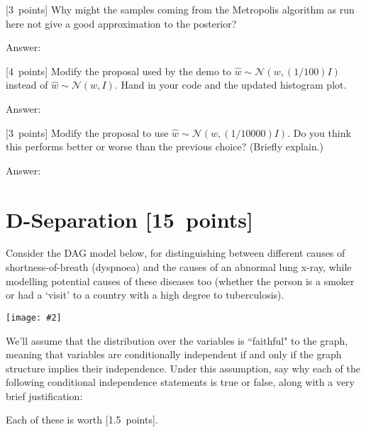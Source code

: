 \documentclass{article}
\newcommand{\ask}[1]{\textcolor{question}{#1}}
\newenvironment{answer}{\par\begingroup\color{answer}Answer: }{\endgroup}
\newcommand{\pts}[1]{\textcolor{points}{[#1~points]}}
\newcommand{\TODO}{\color{red}{TODO}}
\newcommand{\centerfig}[2]{\begin{center}\texttt{[image: \#2]}\end{center}}
\begin{document}
\begin{qlist}

\item \pts{3} \ask{Why might the samples coming from the Metropolis algorithm as run here not give a good approximation to the posterior?}
\begin{answer}\TODO\end{answer}

\item \pts{4} Modify the proposal used by the demo to $\hat{w} \sim \mathcal{N}(w,(1/100) I)$ instead of $\hat{w} \sim \mathcal{N}(w,I)$. \ask{Hand in your code and the updated histogram plot.}

\begin{answer}\TODO\end{answer}

\item \pts{3} Modify the proposal to use $\hat{w} \sim \mathcal{N}(w,(1/10000) I)$. \ask{Do you think this performs better or worse than the previous choice? (Briefly explain.)}
\begin{answer}\TODO\end{answer}

\end{qlist}



\clearpage
\section{D-Separation \pts{15}}

Consider the DAG model below, for distinguishing between different causes of shortness-of-breath (dyspnoea) and the causes of an abnormal lung x-ray, while  modelling potential causes of these diseases too (whether the person is a smoker or had a `visit' to a country with a high degree to tuberculosis).

\centerfig{.8}{figs/bayesNet}

We'll assume that the distribution over the variables is ``faithful" to the graph, meaning that variables are conditionally independent if and only if the graph structure implies their independence. Under this assumption, \ask{say why each of the following conditional independence statements is true or false, along with a very brief justification}:

Each of these is worth \pts{1.5}.
\end{document}
